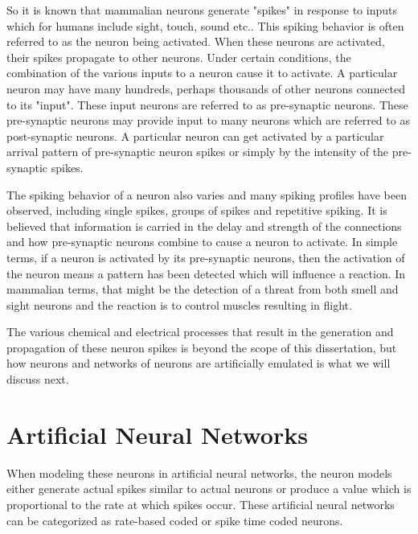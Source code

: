 \iftrue
So it is known that mammalian neurons generate "spikes" in response to inputs which for humans include sight, touch, sound etc.. This spiking behavior is often referred to as the neuron being activated.
When these neurons are activated, their spikes propagate to other neurons. Under certain conditions, the combination of the various inputs to a neuron cause it to activate. 
A particular neuron may have many hundreds, perhaps thousands of other neurons connected to its "input".
These input neurons are referred to as pre-synaptic neurons. These pre-synaptic neurons may provide input to many neurons which are referred to as post-synaptic neurons.
A particular neuron can get activated by a particular arrival pattern of pre-synaptic neuron spikes or simply by the intensity of the pre-synaptic spikes. 

The spiking behavior of a neuron also varies and many spiking profiles have been observed, including single spikes, groups of spikes and repetitive spiking. 
It is believed that information is carried in the delay and strength of the connections and how pre-synaptic neurons combine to cause a neuron to activate.
In simple terms, if a neuron is activated by its pre-synaptic neurons, then the activation of the neuron means a pattern has been detected which will influence a reaction.
In mammalian terms, that might be the detection of a threat from both smell and sight neurons and the reaction is to control muscles resulting in flight.


The various chemical and electrical processes that result in the generation and propagation of these neuron spikes is beyond the scope of this dissertation, but how neurons and networks of neurons are artificially emulated is what we will discuss next.


\section[Artificial Neural Networks]{Artificial Neural Networks}
\label{sec:Artificial Neural Networks}

When modeling these neurons in artificial neural networks, the neuron models either generate actual spikes similar to actual neurons or
produce a value which is proportional to the rate at which spikes occur.
These artificial neural networks can be categorized as rate-based coded or spike time coded neurons.


